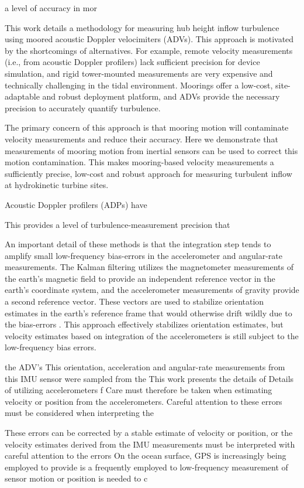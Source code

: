a level of accuracy in mor

This work details a methodology for measuring hub height inflow turbulence using moored acoustic Doppler velocimiters (ADVs). This approach is motivated by the shortcomings of alternatives. For example, remote velocity measurements (i.e., from acoustic Doppler profilers) lack sufficient precision for device simulation, and rigid tower-mounted measurements are very expensive and technically challenging in the tidal environment. Moorings offer a low-cost, site-adaptable and robust deployment platform, and ADVs provide the necessary precision to accurately quantify turbulence.

The primary concern of this approach is that mooring motion will contaminate velocity measurements and reduce their accuracy. Here we demonstrate that  measurements of mooring motion from inertial sensors can be used to correct this motion contamination.  This makes mooring-based velocity measurements a sufficiently precise, low-cost and robust approach for measuring turbulent inflow at hydrokinetic turbine sites.


Acoustic Doppler profilers (ADPs) have 

This provides a level of turbulence-measurement precision that 

An important detail of these methods is that the integration step tends to amplify small low-frequency bias-errors in the accelerometer and angular-rate measurements. The Kalman filtering utilizes the magnetometer measurements of the earth's magnetic field to provide an independent reference vector in the earth's coordinate system, and the accelerometer measurements of gravity provide a second reference vector. These vectors are used to stabilize orientation estimates in the earth's reference frame that would otherwise drift wildly due to the bias-errors \cite[]{Haid+Breitenbach2004, Madgwick++2011}. This approach effectively stabilizes orientation estimates, but velocity estimates based on integration of the accelerometers is still subject to the low-frequency bias errors.

 the ADV's This orientation, acceleration and angular-rate measurements from this IMU sensor were sampled from the 
This work presents the details of 
Details of utilizing accelerometers f Care must therefore be taken when estimating velocity or position from the accelerometers. Careful attention to these errors must be considered when interpreting the 

These errors can be corrected by a stable estimate of velocity or position, or the velocity estimates derived from the IMU measurements must be interpreted with careful attention to the errors  On the ocean surface, GPS is increasingly being employed to provide  is a frequently employed to low-frequency measurement of sensor motion or position is needed to c

